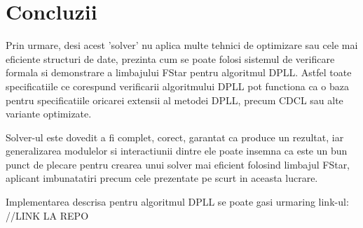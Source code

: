 \chapter*{Concluzii} 


Prin urmare, desi acest 'solver' nu aplica multe tehnici de optimizare sau cele mai eficiente structuri de date, prezinta cum se poate folosi sistemul de verificare formala si demonstrare a limbajului FStar pentru algoritmul DPLL. Astfel toate specificatiile ce corespund verificarii algoritmului DPLL pot functiona ca o baza pentru specificatiile oricarei extensii al metodei DPLL, precum CDCL sau alte variante optimizate.

Solver-ul este dovedit a fi complet, corect, garantat ca produce un rezultat, iar generalizarea modulelor si interactiunii dintre ele poate insemna ca este un bun punct de plecare pentru crearea unui solver mai eficient folosind limbajul FStar, aplicant imbunatatiri precum cele prezentate pe scurt in aceasta lucrare. 


Implementarea descrisa pentru algoritmul DPLL se poate gasi urmaring link-ul: //LINK LA REPO
